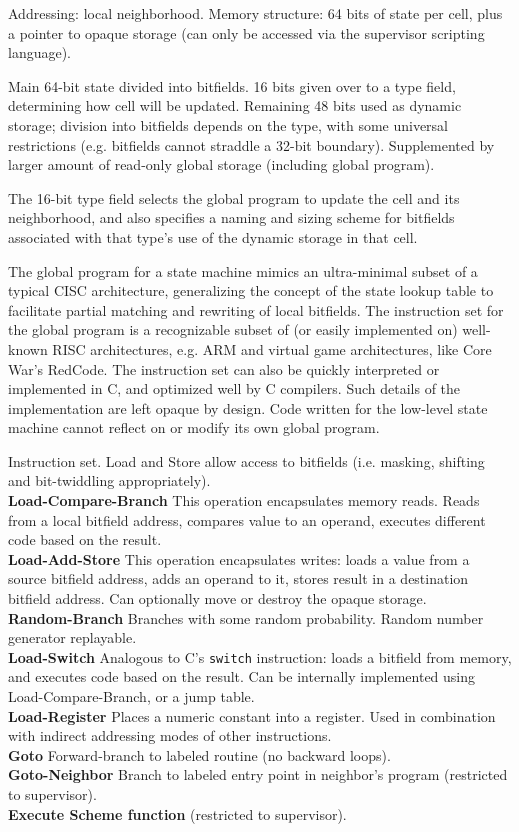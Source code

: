 \documentclass{acm_proc_article-sp}
\begin{document}
Addressing: local neighborhood.
Memory structure: 64 bits of state per cell, plus a pointer to opaque storage (can only be accessed via the supervisor scripting language).

Main 64-bit state divided into bitfields. 16 bits given over to a type field, determining how cell will be updated.
Remaining 48 bits used as dynamic storage; division into bitfields depends on the type, with some universal restrictions (e.g. bitfields cannot straddle a 32-bit boundary).
Supplemented by larger amount of read-only global storage (including global program).

The 16-bit type field selects the global program to update the cell and its neighborhood,
and also specifies a naming and sizing scheme for bitfields associated with that type's use of the dynamic storage in that cell.

The global program for a state machine mimics an ultra-minimal subset of a typical CISC architecture, generalizing the concept of the state lookup table to facilitate partial matching and rewriting of local bitfields.
The instruction set for the global program is a recognizable subset of (or easily implemented on) well-known RISC architectures, e.g. ARM\cite{seal00} and virtual game architectures, like Core War's RedCode\cite{CoreWarGuidelines84}.
The instruction set can also be quickly interpreted or implemented in C, and optimized well by C compilers.
Such details of the implementation are left opaque by design.
Code written for the low-level state machine cannot reflect on or modify its own global program.

Instruction set.
Load and Store allow access to bitfields (i.e. masking, shifting and bit-twiddling appropriately).
\\
{\bf Load-Compare-Branch} This operation encapsulates memory reads. Reads from a local bitfield address, compares value to an operand, executes different code based on the result.
\\
{\bf Load-Add-Store} This operation encapsulates writes: loads a value from a source bitfield address, adds an operand to it, stores result in a destination bitfield address. Can optionally move or destroy the opaque storage.
\\
{\bf Random-Branch} Branches with some random probability. Random number generator replayable.
\\
{\bf Load-Switch} Analogous to C's {\tt switch} instruction: loads a bitfield from memory, and executes code based on the result. Can be internally implemented using Load-Compare-Branch, or a jump table.
\\
{\bf Load-Register} Places a numeric constant into a register. Used in combination with indirect addressing modes of other instructions.
\\
{\bf Goto} Forward-branch to labeled routine (no backward loops).
\\
{\bf Goto-Neighbor} Branch to labeled entry point in neighbor's program (restricted to supervisor).
\\
{\bf Execute Scheme function} (restricted to supervisor).
\end{document}
